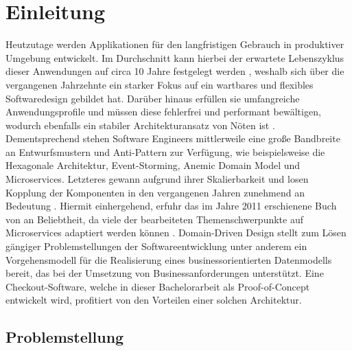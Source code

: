 

\chapter{Einleitung}

Heutzutage werden Applikationen für den langfristigen Gebrauch in produktiver Umgebung entwickelt. Im Durchschnitt kann hierbei der erwartete Lebenszyklus dieser Anwendungen auf circa 10 Jahre festgelegt werden \cite{Tamai.1992}, weshalb sich über die vergangenen Jahrzehnte ein starker Fokus auf ein wartbares und flexibles Softwaredesign gebildet hat. Darüber hinaus erfüllen sie umfangreiche Anwendungsprofile und müssen diese fehlerfrei und performant bewältigen, wodurch ebenfalls ein stabiler Architekturansatz von Nöten ist \cite{Bosch.2001}. Dementsprechend stehen Software Engineers mittlerweile eine große Bandbreite an Entwurfsmustern und Anti-Pattern zur Verfügung, wie beispielsweise die Hexagonale Architektur, Event-Storming, \Gls{Anemic Domain Model} und Microservices. Letzteres gewann aufgrund ihrer Skalierbarkeit und losen Kopplung der Komponenten in den vergangenen Jahren zunehmend an Bedeutung \cite{oreilly.Microservices, Sampaio.2017}. Hiermit einhergehend, erfuhr das im Jahre 2011 erschienene Buch  von \citeauthor{Evans.2011} an Beliebtheit, da viele der bearbeiteten Themenschwerpunkte auf Microservices adaptiert werden können \cite[S. 130ff.]{Vernon.2015}\cite{Microservice.DDD.2017}. Domain-Driven Design stellt zum Lösen gängiger Problemstellungen der Softwareentwicklung unter anderem ein Vorgehensmodell für die Realisierung eines businessorientierten Datenmodells bereit, das bei der Umsetzung von Businessanforderungen unterstützt. Eine Checkout-Software, welche in dieser Bachelorarbeit als Proof-of-Concept entwickelt wird, profitiert von den Vorteilen einer solchen Architektur. 

\section{Problemstellung}

